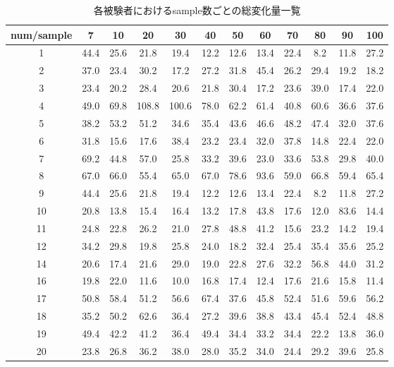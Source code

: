 \documentclass{ltjsreport}
\begin{document}
		\begin{table}[H]
		\begin{center}
		\caption{各被験者におけるsample数ごとの総変化量一覧}
		\label{tab:FVRdata}
		\begin{tabular}{c|ccccccccccc} \toprule
			num/sample & 7 & 10 & 20 & 30 & 40 & 50 & 60 & 70 & 80 & 90 & 100 \\ \hline
			1 & 44.4 & 25.6 & 21.8 & 19.4 & 12.2 & 12.6 & 13.4 & 22.4 & 8.2 & 11.8 & 27.2 \\
			2 & 37.0 & 23.4 & 30.2 & 17.2 & 27.2 & 31.8 & 45.4 & 26.2 & 29.4 & 19.2 & 18.2 \\
			3 & 23.4 & 20.2 & 28.4 & 20.6 & 21.8 & 30.4 & 17.2 & 23.6 & 39.0 & 17.4 & 22.0 \\
			4 & 49.0 & 69.8 & 108.8 & 100.6 & 78.0 & 62.2 & 61.4 & 40.8 & 60.6 & 36.6 & 37.6 \\
			5 & 38.2 & 53.2 & 51.2 & 34.6 & 35.4 & 43.6 & 46.6 & 48.2 & 47.4 & 32.0 & 37.6 \\
			6 & 31.8 & 15.6 & 17.6 & 38.4 & 23.2 & 23.4 & 32.0 & 37.8 & 14.8 & 22.4 & 22.0 \\
			7 & 69.2 & 44.8 & 57.0 & 25.8 & 33.2 & 39.6 & 23.0 & 33.6 & 53.8 & 29.8 & 40.0 \\
			8 & 67.0 & 66.0 & 55.4 & 65.0 & 67.0 & 78.6 & 93.6 & 59.0 & 66.8 & 59.4 & 65.4 \\
			9 & 44.4 & 25.6 & 21.8 & 19.4 & 12.2 & 12.6 & 13.4 & 22.4 & 8.2 & 11.8 & 27.2 \\
			10 & 20.8 & 13.8 & 15.4 & 16.4 & 13.2 & 17.8 & 43.8 & 17.6 & 12.0 & 83.6 & 14.4 \\
			11 & 24.8 & 22.8 & 26.2 & 21.0 & 27.8 & 48.8 & 41.2 & 15.6 & 23.2 & 14.2 & 19.4 \\
			12 & 34.2 & 29.8 & 19.8 & 25.8 & 24.0 & 18.2 & 32.4 & 25.4 & 35.4 & 35.6 & 25.2 \\
			14 & 20.6 & 17.4 & 21.6 & 29.0 & 19.0 & 22.8 & 27.6 & 32.2 & 56.8 & 44.0 & 31.2 \\
			16 & 19.8 & 22.0 & 11.6 & 10.0 & 16.8 & 17.4 & 12.4 & 17.6 & 21.6 & 15.8 & 11.4 \\
			17 & 50.8 & 58.4 & 51.2 & 56.6 & 67.4 & 37.6 & 45.8 & 52.4 & 51.6 & 59.6 & 56.2 \\
			18 & 35.2 & 50.2 & 62.6 & 36.4 & 27.2 & 39.6 & 38.8 & 43.4 & 45.4 & 52.4 & 48.8 \\
			19 & 49.4 & 42.2 & 41.2 & 36.4 & 49.4 & 34.4 & 33.2 & 34.4 & 22.2 & 13.8 & 36.0 \\
			20 & 23.8 & 26.8 & 36.2 & 38.0 & 28.0 & 35.2 & 34.0 & 24.4 & 29.2 & 39.6 & 25.8 \\

\end{tabular}
\end{center}
\end{table}
\end{document}
